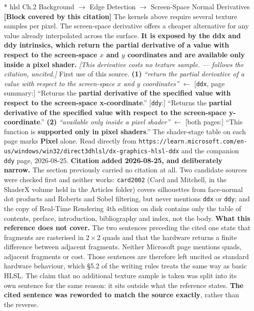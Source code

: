 \documentclass[11pt, a4paper]{article}
\makeatletter
\newcounter{citentry}
\newcommand{\citentry@core}[7]{%
  \stepcounter{citentry}
  \begingroup
  \sbox{\citentry@measurebox}{%
    \begin{minipage}{\linewidth}
      \noindent\colorbox{konstanzblue}{\parbox{\dimexpr\linewidth-2\fboxsep}{%
        \vspace{3pt}
        \textbf{\#\thecitentry \quad #2} \hfill \textit{#3}
        \vspace{3pt}
      }}
      \vspace{3pt}
      \noindent\begin{tabular}{@{}p{2.7cm} p{\dimexpr\linewidth-3cm}@{}}
        \textit{\small Sentence in thesis:} & #4 \\[5pt]
        \textbf{Usage:}\hfill       & #5 \\[5pt]
        \textit{\small Original source:}     & #6 \\[5pt]
        \textbf{How to check:}             & #7 \\
      \end{tabular}
      \vspace{5pt}
      \rule{10pt}{10pt}\quad \textbf{Validated} --- I have read the original and agree it supports the sentence.
    \end{minipage}%
  }%
  \Needspace{\dimexpr\ht\citentry@measurebox+\dp\citentry@measurebox\relax}%
  \endgroup
  \vspace{10pt}
  \noindent\colorbox{konstanzblue}{\parbox{\dimexpr\linewidth-2\fboxsep}{%
    \vspace{3pt}
    \textcolor{white}{\textbf{\#\thecitentry \quad #2}} \hfill \textcolor{white}{\textit{#3}}
    \vspace{3pt}
  }}
  \vspace{3pt}
  \noindent\begin{tabular}{@{}p{2.7cm} p{\dimexpr\linewidth-3cm}@{}}
    \textit{\small Sentence in thesis:} & \textcolor{darkgreen}{#4} \\[5pt]
    \textbf{Usage:}\hfill       & #5 \\[5pt]
    \textit{\small Original source:}     & \textcolor{darkred}{#6} \\[5pt]
    \textbf{How to check:}             & #7 \\
  \end{tabular}
  \vspace{5pt}
  \noindent\CheckBox[name=verified\thecitentry, width=10pt, height=10pt, bordercolor={0 0 0}, borderwidth=0.75, backgroundcolor={1 1 1}#1]{}\quad \textbf{Validated} --- I have read the original and agree it supports the sentence.
  \vspace{3pt}
  \noindent\textcolor{midgray}{\rule{\linewidth}{0.4pt}}
}
\newcommand{\citentry}{\@ifstar{\citentry@core{, checked}}{\citentry@core{}}}
\makeatother
\begin{document}
\begin{Form}
\citentry*
  {hlsl}
  {Ch.2 Background $\rightarrow$ Edge Detection $\rightarrow$ Screen-Space Normal Derivatives}
  {\textbf{[Block covered by this citation]} The kernels above require several texture samples per pixel. The screen-space derivative offers a cheaper alternative for any value already interpolated across the surface. \textbf{It is exposed by the ddx and ddy intrinsics, which return the partial derivative of a value with respect to the screen-space $x$ and $y$ coordinates and are available only inside a pixel shader.} \emph{[This derivative costs no texture sample. --- follows the citation, uncited.]}}
  {First use of this source.}
  {\textbf{(1)} \emph{``return the partial derivative of a value with respect to the screen-space $x$ and $y$ coordinates''} $\leftarrow$ [\texttt{ddx}, page summary:] ``Returns the \textbf{partial derivative of the specified value with respect to the screen-space x-coordinate}.'' [\texttt{ddy}:] ``Returns the \textbf{partial derivative of the specified value with respect to the screen-space y-coordinate}.'' \quad \textbf{(2)} \emph{``available only inside a pixel shader''} $\leftarrow$ [both pages:] ``This function is \textbf{supported only in pixel shaders}.'' The shader-stage table on each page marks \textbf{Pixel} alone.}
  {Read directly from \texttt{\footnotesize https://learn.microsoft.com/en-us/windows/win32/direct3dhlsl/dx-graphics-hlsl-ddx} and the companion \texttt{ddy} page, 2026-08-25. \textbf{Citation added 2026-08-25, and deliberately narrow.} The section previously carried no citation at all. Two candidate sources were checked first and neither works: \texttt{card2002} (Card and Mitchell, in the ShaderX volume held in the Articles folder) covers silhouettes from face-normal dot products and Roberts and Sobel filtering, but never mentions \texttt{ddx} or \texttt{ddy}; and the copy of Real-Time Rendering 4th edition on disk contains only the table of contents, preface, introduction, bibliography and index, not the body. \textbf{What this reference does not cover.} The two sentences preceding the cited one state that fragments are rasterised in $2 \times 2$ quads and that the hardware returns a finite difference between adjacent fragments. Neither Microsoft page mentions quads, adjacent fragments or cost. Those sentences are therefore left uncited as standard hardware behaviour, which \S5.2 of the writing rules treats the same way as basic HLSL. The claim that no additional texture sample is taken was split into its own sentence for the same reason: it sits outside what the reference states. \textbf{The cited sentence was reworded to match the source exactly}, rather than the reverse.}


\end{Form}
\end{document}
